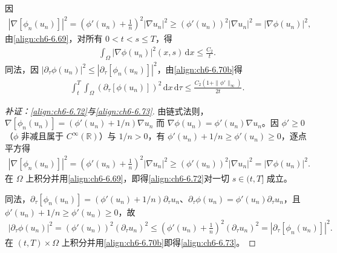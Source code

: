 \documentclass[../../main.tex]{subfiles}%
\begin{document}
\begin{remark}\label{remark:ch06-6.5.3}
因
\begin{align*}
|\nabla[\phi_n(u_n)]|^2=\left(\phi'(u_n)+\frac{1}{n}\right)^2|\nabla u_n|^2
\geqslant(\phi'(u_n))^2|\nabla u_n|^2=|\nabla\phi(u_n)|^2,
\end{align*}
由\eqref{align:ch6-6.69}，对所有 $0<t<s\leqslant T$，得
\begin{align}
\int_\Omega|\nabla\phi(u_n)|^2(x,s)\,\mathrm{d}x\leqslant\frac{C_2}{t}. \label{align:ch6-6.72}
\end{align}
同法，因 $|\partial_\tau\phi(u_n)|^2\leqslant|\partial_\tau[\phi_n(u_n)]|^2$，由\eqref{align:ch6-6.70b}得
\begin{align}
\int_t^T\int_\Omega(\partial_\tau[\phi(u_n)])^2\,\mathrm{d}x\,\mathrm{d}\tau
\leqslant\frac{C_2(1+\|\phi'\|_\infty)}{2t}. \label{align:ch6-6.73}
\end{align}
\end{remark}

\begin{proof}[补证：\eqref{align:ch6-6.72}与\eqref{align:ch6-6.73}]
由链式法则，$\nabla[\phi_n(u_n)]=(\phi'(u_n)+1/n)\nabla u_n$ 而 $\nabla\phi(u_n)=\phi'(u_n)\nabla u_n$。因 $\phi'\geqslant0$（$\phi$ 非减且属于 $C^\infty(\mathbb{R})$）与 $1/n>0$，有 $\phi'(u_n)+1/n\geqslant\phi'(u_n)\geqslant0$，逐点平方得
\begin{align*}
|\nabla[\phi_n(u_n)]|^2=\left(\phi'(u_n)+\frac{1}{n}\right)^2|\nabla u_n|^2
\geqslant(\phi'(u_n))^2|\nabla u_n|^2=|\nabla\phi(u_n)|^2.
\end{align*}
在 $\Omega$ 上积分并用\eqref{align:ch6-6.69}，即得\eqref{align:ch6-6.72}对一切 $s\in(t,T]$ 成立。

同法，$\partial_\tau[\phi_n(u_n)]=(\phi'(u_n)+1/n)\partial_\tau u_n$、$\partial_\tau\phi(u_n)=\phi'(u_n)\partial_\tau u_n$，且 $\phi'(u_n)+1/n\geqslant\phi'(u_n)\geqslant0$，故
\begin{align*}
|\partial_\tau\phi(u_n)|^2=(\phi'(u_n))^2(\partial_\tau u_n)^2
\leqslant\left(\phi'(u_n)+\frac{1}{n}\right)^2(\partial_\tau u_n)^2=|\partial_\tau[\phi_n(u_n)]|^2.
\end{align*}
在 $(t,T)\times\Omega$ 上积分并用\eqref{align:ch6-6.70b}即得\eqref{align:ch6-6.73}。
\end{proof}
\end{document}
